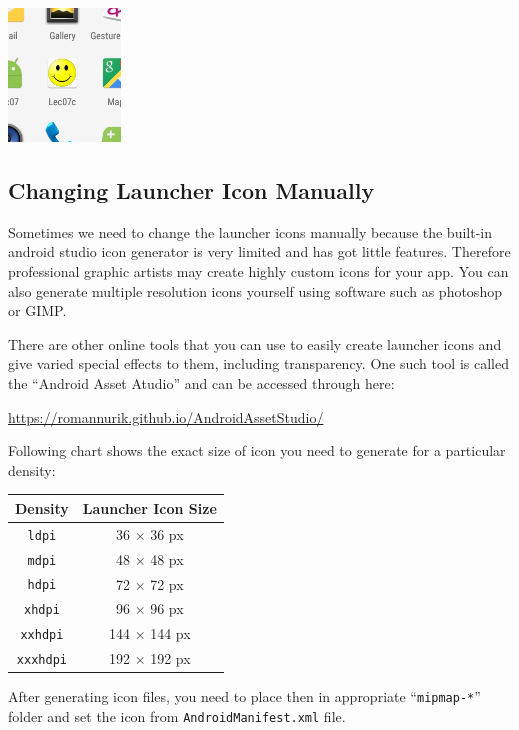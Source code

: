 \begin{center}
	\includegraphics[scale=0.4]{chapters/ch06/images/26}
\end{center}

\subsection{Changing Launcher Icon Manually}
Sometimes we need to change the launcher icons manually because the built-in android studio icon generator is very limited and has got little features. Therefore professional graphic artists may create highly custom icons for your app. You can also generate multiple resolution icons yourself using software such as photoshop or GIMP.

There are other online tools that you can use to easily create launcher icons and give varied special effects to them, including transparency. One such tool is called the ``Android Asset Atudio'' and can be accessed through here:

\url{https://romannurik.github.io/AndroidAssetStudio/}

Following chart shows the exact size of icon you need to generate for a particular density:

\begin{center}
	\begin{tabular}{|c|c|}
		\hline \textbf{Density}	& \textbf{Launcher Icon Size} \\
		\hline
		\hline \texttt{ldpi} & 36 $\times$ 36 px \\
		\hline \texttt{mdpi} & 48 $\times$ 48 px \\
		\hline \texttt{hdpi} & 72 $\times$ 72 px \\
		\hline \texttt{xhdpi} & 96 $\times$ 96 px \\
		\hline \texttt{xxhdpi} & 144 $\times$ 144 px \\
		\hline \texttt{xxxhdpi} & 192 $\times$ 192 px \\
		\hline 
	\end{tabular} 
\end{center}

After generating icon files, you need to place then in appropriate ``\texttt{mipmap-*}'' folder and set the icon from \texttt{AndroidManifest.xml} file. \\

